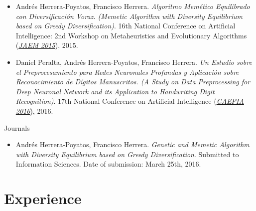 \documentclass[10pt,a4paper,sans]{moderncv} %
\begin{document}
		\begin{itemize}
			\item  Andrés Herrera-Poyatos, Francisco Herrera. \textit{Algoritmo Memético Equilibrado con Diversificación Voraz. (Memetic Algorithm with Diversity Equilibrium based on Greedy Diversification)}. 16th National Conference on Artificial Intelligence: 2nd Workshop on Metaheuristics and Evolutionary Algorithms (\textcolor{color1}{\textit{\href{http://simd.albacete.org/caepia15/conferencia/jaem2015/}{JAEM 2015}}}), 2015.
		\end{itemize}

		\begin{itemize}
			\item Daniel Peralta, Andrés Herrera-Poyatos, Francisco Herrera. \textit{Un Estudio sobre el Preprocesamiento para Redes Neuronales Profundas y Aplicación sobre Reconocimiento de Dígitos Manuscritos. (A Study on Data Preprocessing for Deep Neuronal Network and its Application to Handwriting Digit Recognition)}. 17th National Conference on Artificial Intelligence (\textcolor{color1}{\textit{\href{http://www.congresocedi.es/es/caepia}{CAEPIA 2016}}}), 2016.
		\end{itemize}

	{\large \textcolor{color1}{Journals}}

		\begin{itemize}
			\item Andrés Herrera-Poyatos, Francisco Herrera. \textit{Genetic and Memetic Algorithm with Diversity Equilibrium based on Greedy Diversification}. Submitted to Information Sciences. Date of submission: March 25th, 2016.
		\end{itemize}
	


\section{Experience}


	
\end{document}
